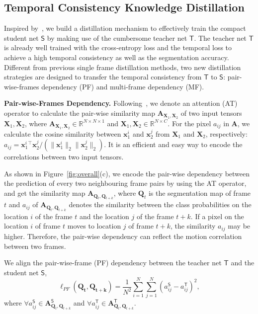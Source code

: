 \documentclass[runningheads]{llncs}
\begin{document}
\subsection{Temporal Consistency Knowledge Distillation }
\label{sec:tckd}

Inspired by~\cite{liu2019structured}, we build a distillation mechanism to effectively train the compact student net $\mathsf{S}$ by making use of the cumbersome teacher net $\mathsf{T}$. The teacher net $\mathsf{T}$ is already well trained with the cross-entropy loss and the temporal loss to achieve a high temporal consistency as well as the segmentation accuracy. Different from previous single frame distillation methods,
two new distillation
strategies
are designed to transfer the temporal consistency from $\mathsf{T}$ to $\mathsf{S}$: pair-wise-frames dependency (PF) and multi-frame dependency (MF).

\noindent\textbf{Pair-wise-Frames Dependency.}
Following~\cite{liu2019structured}, we denote an attention (AT) operator to calculate the pair-wise similarity map $\mathbf{A}_{\mathbf{X}_1,\mathbf{X}_2}$ of two input tensors $\mathbf{X}_1,\mathbf{X}_2$, where $\mathbf{A}_{\mathbf{X}_1,\mathbf{X}_2} \in \mathbb{R}^{N \times N  \times 1}$ and $\mathbf{X}_1,\mathbf{X}_2 \in \mathbb{R}^{N  \times C} $. For the pixel $a_{ij}$ in $\mathbf{A}$, we calculate the cosine similarity between $\mathbf{x}_{1}^{i}$ and $\mathbf{x}_{2}^{j}$ from $\mathbf{X}_1$ and $\mathbf{X}_2$, respectively: $a_{ij} = {\mathbf{x}_1^i{}^\top \mathbf{x}_{2}^j}/{(\|\mathbf{x}_1^i\|_2\|\mathbf{x}_{2}^j\|_2)}$. It is an efficient and easy way to encode the correlations between two input tensors.

As shown in Figure~\ref{fig:overall}(c), we encode the pair-wise dependency between the prediction of every two neighbouring frame pairs by using the AT operator, and get the similarity map $\mathbf{A}_{\mathbf{Q}_t,\mathbf{Q}_{t+k}}$, where $\mathbf{Q}_t$ is the segmentation map of frame $t$ and $a_{ij}$ of $\mathbf{A}_{\mathbf{Q}_t,\mathbf{Q}_{t+k}}$ denotes the similarity between the class probabilities on the location $i$ of the frame $t$ and the location $j$ of the frame $t+k$. If a pixel on the location $i$ of frame $t$ moves to location $j$ of frame $t+k$, the similarity $a_{ij}$ may be higher. Therefore, the pair-wise dependency can reflect the motion correlation between two frames.

We align the pair-wise-frame (PF) dependency between the teacher net $\mathsf{T}$ and the student net $\mathsf{S}$,
\begin{equation}
    \ell_{PF}(\mathbf{Q_t},\mathbf{Q_{t+k}})=\frac{1}{N^2}\sum_{i=1}^{N}\sum_{j=1}^{N}(a_{ij}^\mathsf{S}-a_{ij}^\mathsf{T})^{2},
\end{equation}
\noindent where $\forall a_{ij}^\mathsf{S} \in \mathbf{A}_{\mathbf{Q}_t,\mathbf{Q}_{t+k}}^\mathsf{S}$ and $
    \forall a_{ij}^\mathsf{T} \in \mathbf{A}_{\mathbf{Q}_t,\mathbf{Q}_{t+k}}^\mathsf{T}$.
\end{document}
